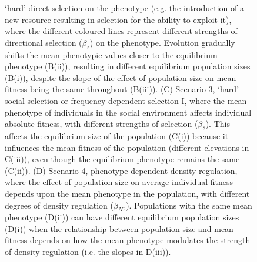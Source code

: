 \documentclass{article}
\begin{document}
\begin{figure} [H]
{`hard' direct selection on the phenotype (e.g. the introduction of a new resource resulting in selection for the ability to exploit it), where the different coloured lines represent different strengths of directional selection ($\beta_{{z}}$) on the phenotype. Evolution gradually shifts the mean phenotypic values closer to the equilibrium phenotype (B(ii)), resulting in different equilibrium population sizes (B(i)), despite the slope of the effect of population size on mean fitness being the same throughout (B(iii)). (C) Scenario 3, 
`hard' social selection or frequency-dependent selection I, where the mean phenotype of individuals in the social environment affects individual absolute fitness, with different strengths of selection ($\beta_{\bar{z}}$). This affects the equilibrium size of the population (C(i)) because it influences the mean fitness of the population (different elevations in C(iii)), even though the equilibrium phenotype remains the same (C(ii)). (D) Scenario 4, phenotype-dependent density regulation, where the effect of population size on average individual fitness depends upon the mean phenotype in the population, with different degrees of density regulation ($\beta_{{N\bar{z}}}$). Populations with the same mean phenotype (D(ii)) can have different equilibrium population sizes (D(i)) when the relationship between population size and mean fitness depends on how the mean phenotype modulates the strength of density regulation (i.e. the slopes in D(iii)).}
	\label{fig:sim2}
\end{figure}
\newpage
\end{document}
